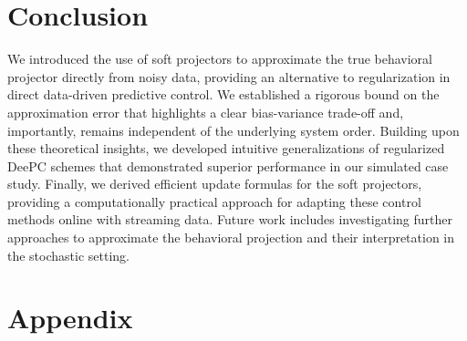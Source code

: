 \documentclass[letterpaper, 10 pt, conference]{ieeeconf}
\begin{document}
\section{Conclusion} \label{sec:conclusion}
We introduced the use of soft projectors to approximate the true behavioral projector directly from noisy data, providing an alternative to regularization in direct data-driven predictive control.
We established a rigorous bound on the approximation error that highlights a clear bias-variance trade-off and, importantly, remains independent of the underlying system order.
Building upon these theoretical insights, we developed intuitive generalizations of regularized \gls{DeePC} schemes that demonstrated superior performance in our simulated case study.
Finally, we derived efficient update formulas for the soft projectors, providing a computationally practical approach for adapting these control methods online with streaming data.
Future work includes investigating further approaches to approximate the behavioral projection and their interpretation in the stochastic setting. 

\section*{Appendix}
\appendices
\end{document}
